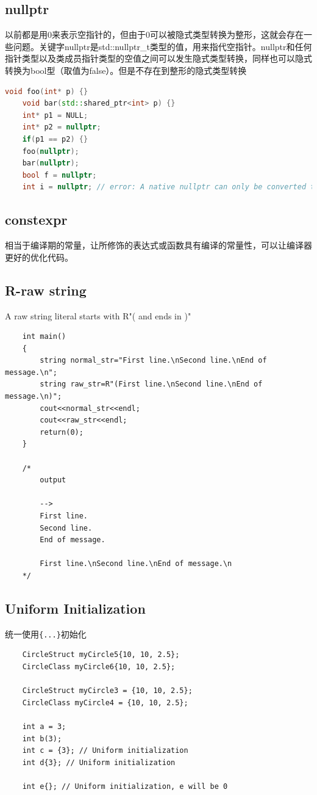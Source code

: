 \documentclass[UTF8,a4paper,12pt]{ctexbook} %
\begin{document}
		\subsection{nullptr}
			以前都是用0来表示空指针的，但由于0可以被隐式类型转换为整形，这就会存在一些问题。关键字nullptr是std::nullptr\_t类型的值，用来指代空指针。nullptr和任何指针类型以及类成员指针类型的空值之间可以发生隐式类型转换，同样也可以隐式转换为bool型（取值为false）。但是不存在到整形的隐式类型转换
		
				\begin{lstlisting}[language=C++]
	void foo(int* p) {}
	void bar(std::shared_ptr<int> p) {}
	int* p1 = NULL;
	int* p2 = nullptr;   
	if(p1 == p2) {}
	foo(nullptr);
	bar(nullptr);
	bool f = nullptr;
	int i = nullptr; // error: A native nullptr can only be converted to bool or, using reinterpret_cast, to an integral type					
				\end{lstlisting}
		
		\subsection{constexpr}
			相当于编译期的常量，让所修饰的表达式或函数具有编译的常量性，可以让编译器更好的优化代码。
		
		\subsection{R-raw string}
			A raw string literal starts with R"( and ends in )"
				\begin{lstlisting}
	int main()
	{
		string normal_str="First line.\nSecond line.\nEnd of message.\n";
		string raw_str=R"(First line.\nSecond line.\nEnd of message.\n)";
		cout<<normal_str<<endl;
		cout<<raw_str<<endl;
		return(0);
	}
	
	/*
		output
		
		-->
		First line.
		Second line.
		End of message.
		
		First line.\nSecond line.\nEnd of message.\n
	*/				
				\end{lstlisting}
		\subsection{Uniform Initialization} 统一使用\verb|{...}|初始化
			\begin{lstlisting}
	CircleStruct myCircle5{10, 10, 2.5};
	CircleClass myCircle6{10, 10, 2.5};
	
	CircleStruct myCircle3 = {10, 10, 2.5};
	CircleClass myCircle4 = {10, 10, 2.5};
	
	int a = 3;
	int b(3);
	int c = {3}; // Uniform initialization
	int d{3}; // Uniform initialization
	
	int e{}; // Uniform initialization, e will be 0
			\end{lstlisting}
			
\end{document}
